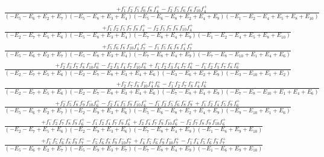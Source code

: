 \documentclass{article}
\begin{document}
\[\begin{array}{rcl}
\frac{+f_{1}^{-}f_{2}^{-}f_{5}^{-}f_{6}^{-}f_{8}^{-}f_{4}^{+}-f_{2}^{-}f_{5}^{-}f_{6}^{-}f_{8}^{-}f_{10}^{-}f_{4}^{+}}{(-E_{5}-E_{6}+E_{2}+E_{7})(-E_{5}-E_{8}+E_{3}+E_{4})(-E_{5}-E_{6}-E_{8}+E_{2}+E_{4}+E_{9})(-E_{1}-E_{2}-E_{4}+E_{5}+E_{8}+E_{10})}\\
\frac{+f_{1}^{-}f_{2}^{-}f_{5}^{-}f_{7}^{-}f_{8}^{-}f_{4}^{+}-f_{2}^{-}f_{5}^{-}f_{7}^{-}f_{8}^{-}f_{10}^{-}f_{4}^{+}}{(-E_{2}-E_{7}+E_{5}+E_{6})(-E_{5}-E_{8}+E_{3}+E_{4})(-E_{7}-E_{8}+E_{4}+E_{9})(-E_{1}-E_{2}-E_{4}+E_{5}+E_{8}+E_{10})}\\
\frac{+f_{5}^{-}f_{6}^{-}f_{8}^{-}f_{10}^{-}f_{4}^{+}f_{7}^{+}-f_{1}^{-}f_{5}^{-}f_{6}^{-}f_{8}^{-}f_{4}^{+}f_{7}^{+}}{(-E_{5}-E_{6}+E_{2}+E_{7})(-E_{5}-E_{8}+E_{3}+E_{4})(-E_{7}-E_{8}+E_{4}+E_{9})(-E_{7}-E_{8}-E_{10}+E_{1}+E_{4}+E_{6})}\\
\frac{+f_{2}^{-}f_{3}^{-}f_{7}^{-}f_{8}^{-}f_{10}^{-}f_{6}^{+}-f_{2}^{-}f_{3}^{-}f_{4}^{-}f_{7}^{-}f_{10}^{-}f_{6}^{+}+f_{1}^{-}f_{2}^{-}f_{3}^{-}f_{4}^{-}f_{7}^{-}f_{6}^{+}-f_{1}^{-}f_{2}^{-}f_{3}^{-}f_{7}^{-}f_{8}^{-}f_{6}^{+}}{(-E_{2}-E_{7}+E_{5}+E_{6})(-E_{2}-E_{7}-E_{8}+E_{3}+E_{4}+E_{6})(-E_{3}-E_{6}+E_{2}+E_{9})(-E_{3}-E_{10}+E_{1}+E_{2})}\\
\frac{+f_{2}^{-}f_{7}^{-}f_{8}^{-}f_{10}^{-}f_{4}^{+}f_{6}^{+}-f_{1}^{-}f_{2}^{-}f_{7}^{-}f_{8}^{-}f_{4}^{+}f_{6}^{+}}{(-E_{2}-E_{7}+E_{5}+E_{6})(-E_{2}-E_{7}-E_{8}+E_{3}+E_{4}+E_{6})(-E_{7}-E_{8}+E_{4}+E_{9})(-E_{7}-E_{8}-E_{10}+E_{1}+E_{4}+E_{6})}\\
\frac{+f_{2}^{-}f_{5}^{-}f_{8}^{-}f_{9}^{-}f_{10}^{-}f_{6}^{+}-f_{2}^{-}f_{4}^{-}f_{5}^{-}f_{9}^{-}f_{10}^{-}f_{6}^{+}-f_{1}^{-}f_{2}^{-}f_{5}^{-}f_{6}^{-}f_{8}^{-}f_{9}^{-}+f_{1}^{-}f_{2}^{-}f_{4}^{-}f_{5}^{-}f_{9}^{-}f_{6}^{+}}{(-E_{5}-E_{6}+E_{2}+E_{7})(-E_{2}-E_{9}+E_{3}+E_{6})(-E_{5}-E_{6}-E_{8}+E_{2}+E_{4}+E_{9})(-E_{9}-E_{10}+E_{1}+E_{6})}\\
\frac{+f_{1}^{-}f_{2}^{-}f_{7}^{-}f_{8}^{-}f_{9}^{-}f_{6}^{+}-f_{1}^{-}f_{2}^{-}f_{4}^{-}f_{7}^{-}f_{9}^{-}f_{6}^{+}+f_{2}^{-}f_{4}^{-}f_{7}^{-}f_{9}^{-}f_{10}^{-}f_{6}^{+}-f_{2}^{-}f_{7}^{-}f_{8}^{-}f_{9}^{-}f_{10}^{-}f_{6}^{+}}{(-E_{2}-E_{7}+E_{5}+E_{6})(-E_{2}-E_{9}+E_{3}+E_{6})(-E_{7}-E_{8}+E_{4}+E_{9})(-E_{1}-E_{6}+E_{9}+E_{10})}\\
\frac{+f_{1}^{-}f_{5}^{-}f_{6}^{-}f_{8}^{-}f_{9}^{-}f_{7}^{+}-f_{5}^{-}f_{6}^{-}f_{8}^{-}f_{9}^{-}f_{10}^{-}f_{7}^{+}+f_{4}^{-}f_{5}^{-}f_{6}^{-}f_{9}^{-}f_{10}^{-}f_{7}^{+}-f_{1}^{-}f_{4}^{-}f_{5}^{-}f_{6}^{-}f_{9}^{-}f_{7}^{+}}{(-E_{5}-E_{6}+E_{2}+E_{7})(-E_{5}-E_{9}+E_{3}+E_{7})(-E_{7}-E_{8}+E_{4}+E_{9})(-E_{1}-E_{6}+E_{9}+E_{10})}\\

\end{array}\]
\end{document}
